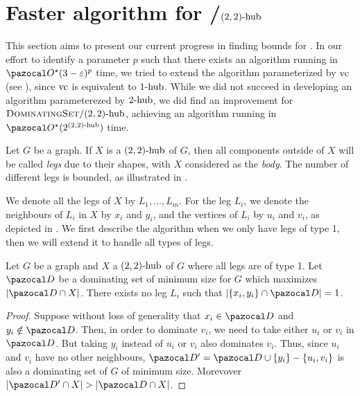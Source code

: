 \section{Faster algorithm for /$\sdhub[2,2]$}
\label{section:domset-22hub}

This section aims to present our current progress in finding bounds for . In our effort to identify a parameter $p$ such that there exists an algorithm running in $\O^\star(3 - \varepsilon)^p$ time, we tried to extend the algorithm parameterized by $\vc$ (see ), since $\vc$ is equivalent to $\shub[1]$. While we did not succeed in developing an algorithm parameterezed by $\shub[2]$, we did find an improvement for $\prob{DominatingSet}/\sdhub[2,2]$, achieving an algorithm running in $\O^\star(2^{\sdhub[2,2]})$ time.

\medskip

Let $G$ be a graph. If $X$ is a $\sdhub[2,2]$ of $G$, then all components outside of $X$ will be called \textit{legs} due to their shapes, with $X$ considered as the \textit{body}. The number of different legs is bounded, as illustrated in .



We denote all the legs of $X$ by $L_1, \dots, L_m$. For the leg $L_i$, we denote the neighbours of $L_i$ in $X$ by $x_i$ and $y_i$, and the vertices of $L_i$ by $u_i$ and $v_i$, as depicted in . We first describe the algorithm when we only have legs of type 1, then we will extend it to handle all types of legs.

\begin{lemma}
    \label{lemma:legs}
    Let $G$ be a graph and $X$ a $\sdhub[2,2]$ of $G$ where all legs are of type 1. Let $\D$ be a dominating set of minimum size for $G$ which maximizes $|\D \cap X|$. There exists no leg $L_i$ such that $|\{x_i, y_i\} \cap \D| = 1$.
\end{lemma}

\begin{proof}
    Suppose without loss of generality that $x_i \in \D$ and $y_i \notin \D$. Then, in order to dominate $v_i$, we need to take either $u_i$ or $v_i$ in $\D$. But taking $y_i$ instead of $u_i$ or $v_i$ also dominates $v_i$. Thus, since $u_i$ and $v_i$ have no other neighbours, $\D' = \D \cup \{y_i\} - \{u_i, v_i\}$ is also a dominating set of $G$ of minimum size. Morevover $|\D' \cap X| > |\D \cap X|$.
\end{proof}

